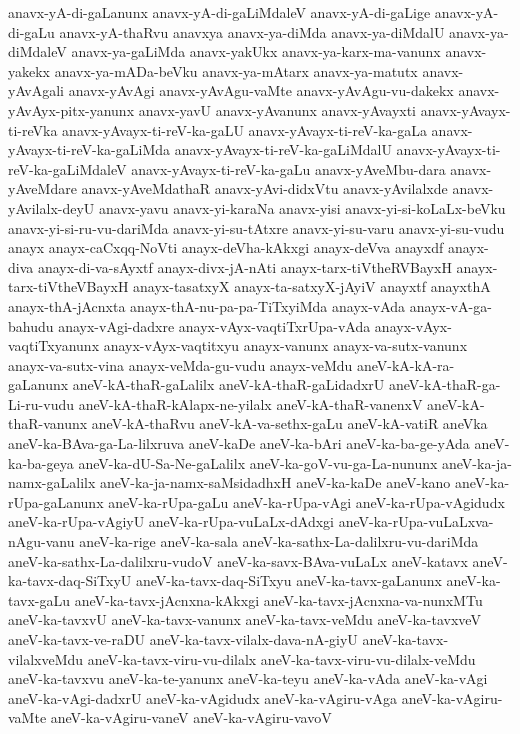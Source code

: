 {anavx-yA-di-gaLanunx
anavx-yA-di-gaLiMdaleV
anavx-yA-di-gaLige
anavx-yA-di-gaLu
anavx-yA-thaRvu
anavxya
anavx-ya-diMda
anavx-ya-diMdalU
anavx-ya-diMdaleV
anavx-ya-gaLiMda
anavx-yakUkx
anavx-ya-karx-ma-vanunx
anavx-yakekx
anavx-ya-mADa-beVku
anavx-ya-mAtarx
anavx-ya-matutx
anavx-yAvAgali
anavx-yAvAgi
anavx-yAvAgu-vaMte
anavx-yAvAgu-vu-dakekx
anavx-yAvAyx-pitx-yanunx
anavx-yavU
anavx-yAvanunx
anavx-yAvayxti
anavx-yAvayx-ti-reVka
anavx-yAvayx-ti-reV-ka-gaLU
anavx-yAvayx-ti-reV-ka-gaLa
anavx-yAvayx-ti-reV-ka-gaLiMda
anavx-yAvayx-ti-reV-ka-gaLiMdalU
anavx-yAvayx-ti-reV-ka-gaLiMdaleV
anavx-yAvayx-ti-reV-ka-gaLu
anavx-yAveMbu-dara
anavx-yAveMdare
anavx-yAveMdathaR
anavx-yAvi-didxVtu
anavx-yAvilalxde
anavx-yAvilalx-deyU
anavx-yavu
anavx-yi-karaNa
anavx-yisi
anavx-yi-si-koLaLx-beVku
anavx-yi-si-ru-vu-dariMda
anavx-yi-su-tAtxre
anavx-yi-su-varu
anavx-yi-su-vudu
anayx
anayx-caCxqq-NoVti
anayx-deVha-kAkxgi
anayx-deVva
anayxdf
anayx-diva
anayx-di-va-sAyxtf
anayx-divx-jA-nAti
anayx-tarx-tiVtheRVBayxH
anayx-tarx-tiVtheVBayxH
anayx-tasatxyX
anayx-ta-satxyX-jAyiV
anayxtf
anayxthA
anayx-thA-jAcnxta
anayx-thA-nu-pa-pa-TiTxyiMda
anayx-vAda
anayx-vA-ga-bahudu
anayx-vAgi-dadxre
anayx-vAyx-vaqtiTxrUpa-vAda
anayx-vAyx-vaqtiTxyanunx
anayx-vAyx-vaqtitxyu
anayx-vanunx
anayx-va-sutx-vanunx
anayx-va-sutx-vina
anayx-veMda-gu-vudu
anayx-veMdu
aneV-kA-kA-ra-gaLanunx
aneV-kA-thaR-gaLalilx
aneV-kA-thaR-gaLidadxrU
aneV-kA-thaR-ga-Li-ru-vudu
aneV-kA-thaR-kAlapx-ne-yilalx
aneV-kA-thaR-vanenxV
aneV-kA-thaR-vanunx
aneV-kA-thaRvu
aneV-kA-va-sethx-gaLu
aneV-kA-vatiR
aneVka
aneV-ka-BAva-ga-La-lilxruva
aneV-kaDe
aneV-ka-bAri
aneV-ka-ba-ge-yAda
aneV-ka-ba-geya
aneV-ka-dU-Sa-Ne-gaLalilx
aneV-ka-goV-vu-ga-La-nununx
aneV-ka-ja-namx-gaLalilx
aneV-ka-ja-namx-saMsidadhxH
aneV-ka-kaDe
aneV-kano
aneV-ka-rUpa-gaLanunx
aneV-ka-rUpa-gaLu
aneV-ka-rUpa-vAgi
aneV-ka-rUpa-vAgidudx
aneV-ka-rUpa-vAgiyU
aneV-ka-rUpa-vuLaLx-dAdxgi
aneV-ka-rUpa-vuLaLxva-nAgu-vanu
aneV-ka-rige
aneV-ka-sala
aneV-ka-sathx-La-dalilxru-vu-dariMda
aneV-ka-sathx-La-dalilxru-vudoV
aneV-ka-savx-BAva-vuLaLx
aneV-katavx
aneV-ka-tavx-daq-SiTxyU
aneV-ka-tavx-daq-SiTxyu
aneV-ka-tavx-gaLanunx
aneV-ka-tavx-gaLu
aneV-ka-tavx-jAcnxna-kAkxgi
aneV-ka-tavx-jAcnxna-va-nunxMTu
aneV-ka-tavxvU
aneV-ka-tavx-vanunx
aneV-ka-tavx-veMdu
aneV-ka-tavxveV
aneV-ka-tavx-ve-raDU
aneV-ka-tavx-vilalx-dava-nA-giyU
aneV-ka-tavx-vilalxveMdu
aneV-ka-tavx-viru-vu-dilalx
aneV-ka-tavx-viru-vu-dilalx-veMdu
aneV-ka-tavxvu
aneV-ka-te-yanunx
aneV-ka-teyu
aneV-ka-vAda
aneV-ka-vAgi
aneV-ka-vAgi-dadxrU
aneV-ka-vAgidudx
aneV-ka-vAgiru-vAga
aneV-ka-vAgiru-vaMte
aneV-ka-vAgiru-vaneV
aneV-ka-vAgiru-vavoV
}
